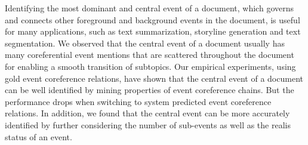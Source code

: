 Identifying the most dominant and central event of a document, which governs and connects other foreground and background events in the document, is useful for many applications, such as text summarization, storyline generation and text segmentation. We observed that the central event of a document usually has many coreferential event mentions that are scattered throughout the document for enabling a smooth transition of subtopics. Our empirical experiments, using gold event coreference relations, have shown that the central event of a document can be well identified by mining properties of event coreference chains. But the performance drops when switching to system predicted event coreference relations. In addition, we found that the central event can be more accurately identified by further considering the number of sub-events as well as the realis status of an event.
